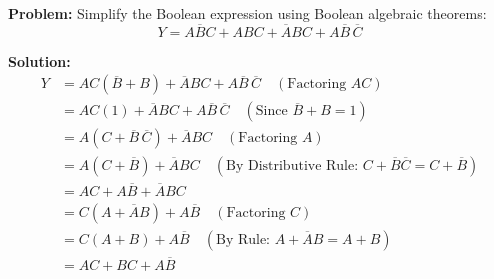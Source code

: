 \begin{examplebox}
\textbf{Problem:} Simplify the Boolean expression using Boolean algebraic theorems:
\begin{equation}
Y = A \overline{B} C + A B C + \overline{A} B C + A \overline{B} \, \overline{C}
\end{equation}

\textbf{Solution:}
\begin{align*}
Y &= A C (\overline{B} + B) + \overline{A} B C + A \overline{B} \, \overline{C} \quad (\text{Factoring } AC) \\
&= A C (1) + \overline{A} B C + A \overline{B} \, \overline{C} \quad (\text{Since } \overline{B} + B = 1) \\
&= A (C + \overline{B} \, \overline{C}) + \overline{A} B C \quad (\text{Factoring } A) \\
&= A (C + \overline{B}) + \overline{A} B C \quad (\text{By Distributive Rule: } C + \overline{B} \overline{C} = C + \overline{B}) \\
&= A C + A \overline{B} + \overline{A} B C \\
&= C (A + \overline{A} B) + A \overline{B} \quad (\text{Factoring } C) \\
&= C (A + B) + A \overline{B} \quad (\text{By Rule: } A + \overline{A} B = A + B) \\
&= A C + B C + A \overline{B}
\end{align*}
\end{examplebox}


